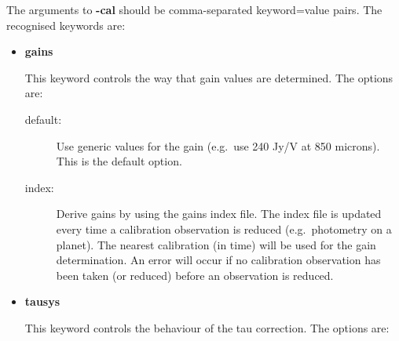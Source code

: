 \documentclass[twoside,11pt]{article}
\renewcommand{\_}{\texttt{\symbol{95}}}
\begin{document}
The arguments to \textbf{-cal} should be comma-separated 
keyword=value pairs. The recognised keywords are:

\begin{itemize}
\item \textbf{gains} \mbox{}

This keyword controls the way that gain values are determined. The options
are:

\begin{description}
\item[default:] Use generic values for the gain (e.g.\ use 240 Jy/V at 850
microns). This is the default option.
\item[index:] Derive gains by using the gains index file. The index file
is updated every time a calibration observation is reduced (e.g.\ photometry
on a planet). The nearest calibration (in
time) will be used for the gain determination. An error will occur if
no calibration observation has been taken (or reduced) before an observation
is reduced.
\end{description}


\item \textbf{tausys} \mbox{}

This keyword controls the behaviour of the tau correction. The options
are:


\end{itemize}
\end{document}
